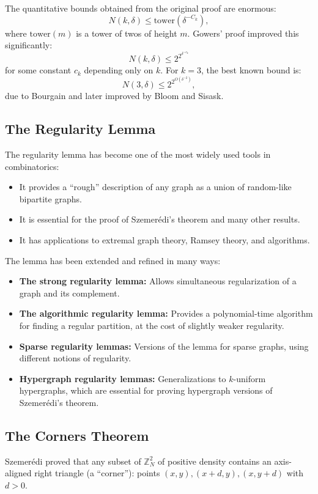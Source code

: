 The quantitative bounds obtained from the original proof are enormous:
\[
N(k, \delta) \leq \text{tower}(\delta^{-C_k}),
\]
where $\text{tower}(m)$ is a tower of twos of height $m$. Gowers' proof improved this significantly:
\[
N(k, \delta) \leq 2^{2^{\delta^{-c_k}}}
\]
for some constant $c_k$ depending only on $k$. For $k=3$, the best known bound is:
\[
N(3, \delta) \leq 2^{2^{O(\delta^{-2})}},
\]
due to Bourgain and later improved by Bloom and Sisask.

\subsection{The Regularity Lemma}

The regularity lemma has become one of the most widely used tools in combinatorics:
\begin{itemize}
\item It provides a ``rough'' description of any graph as a union of random-like bipartite graphs.
\item It is essential for the proof of Szemer\'edi's theorem and many other results.
\item It has applications to extremal graph theory, Ramsey theory, and algorithms.
\end{itemize}

The lemma has been extended and refined in many ways:
\begin{itemize}
\item \textbf{The strong regularity lemma:} Allows simultaneous regularization of a graph and its complement.
\item \textbf{The algorithmic regularity lemma:} Provides a polynomial-time algorithm for finding a regular partition, at the cost of slightly weaker regularity.
\item \textbf{Sparse regularity lemmas:} Versions of the lemma for sparse graphs, using different notions of regularity.
\item \textbf{Hypergraph regularity lemmas:} Generalizations to $k$-uniform hypergraphs, which are essential for proving hypergraph versions of Szemer\'edi's theorem.
\end{itemize}

\subsection{The Corners Theorem}

Szemer\'edi proved that any subset of $\mathbb{Z}_N^2$ of positive density contains an axis-aligned right triangle (a ``corner''): points $(x, y), (x+d, y), (x, y+d)$ with $d > 0$.

